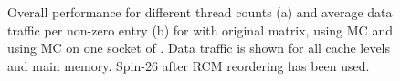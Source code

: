   \begin{figure}[thbp]
  	\centering
  	\hspace{1em}
  	
  	\caption{Overall performance for different thread counts (a) and average data traffic per non-zero entry (b) for \SpMV with original matrix, \SpMV using MC and \SymmSpmv using MC on one socket of \IVB. Data traffic is shown for all cache levels and main memory. Spin-26 after RCM reordering has been used.}
  	\label{fig:motivation}
  \end{figure}
 

